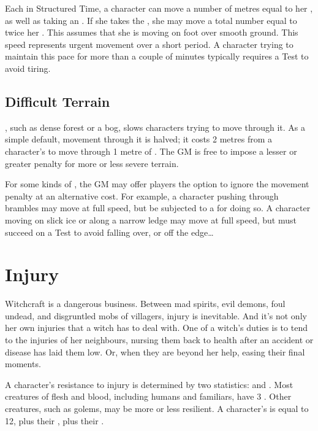 Each {\turn} in Structured Time, a character can move a number of metres equal to her , as well as taking an {\action}.
If she takes the  {\action}, she may move a total number equal to twice her .
This assumes that she is moving on foot over smooth ground.
This speed represents urgent movement over a short period.
A character trying to maintain this pace for more than a couple of minutes typically requires a  Test to avoid tiring.



\subsection{Difficult Terrain}

{\diffterrain}, such as dense forest or a bog, slows characters trying to move through it.
As a simple default, movement through it is halved; it costs 2 metres from a character's  to move through 1 metre of {\diffterrain}.
The GM is free to impose a lesser or greater penalty for more or less severe terrain.

For some kinds of {\diffterrain}, the GM may offer players the option to ignore the movement penalty at an alternative cost.
For example, a character pushing through brambles may move at full speed, but be subjected to a {\damagetest} for doing so.
A character moving on slick ice or along a narrow ledge may move at full speed, but must succeed on a  Test to avoid falling over, or off the edge{\dots}

\section{Injury}

Witchcraft is a dangerous business.
Between mad spirits, evil demons, foul undead, and disgruntled mobs of villagers, injury is inevitable.
And it's not only her own injuries that a witch has to deal with.
One of a witch's duties is to tend to the injuries of her neighbours, nursing them back to health after an accident or disease has laid them low.
Or, when they are beyond her help, easing their final moments.

A character's resistance to injury is determined by two statistics:  and .
Most creatures of flesh and blood, including humans and familiars, have $3$ .
Other creatures, such as golems, may be more or less resilient.
A character's  is equal to 12, plus their , plus their .

